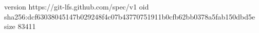 version https://git-lfs.github.com/spec/v1
oid sha256:dcf63038045147b029248f4c07b43770751911b0cfb62bb0378a5fab150dbd5e
size 83411
